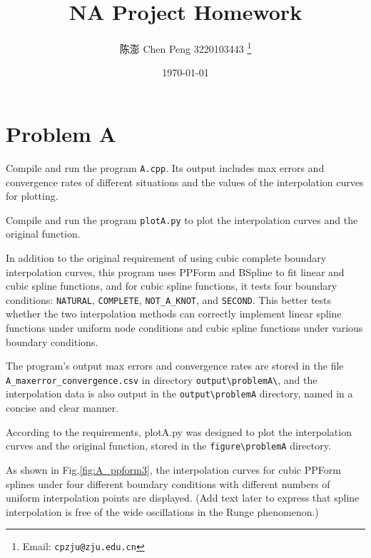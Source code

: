\documentclass[a4paper]{article}
\begin{document}
\begin{sloppypar}
\title{NA Project Homework}

\author{陈澎 Chen Peng 3220103443
  \thanks{Email: \texttt{cpzju@zju.edu.cn}}}

\date{\today}

\maketitle

\section*{Problem A}
Compile and run the program \verb|A.cpp|. Its output includes max errors and convergence rates of different situations and the values of the interpolation curves for plotting.

Compile and run the program \verb|plotA.py| to plot the interpolation curves
and the original function.

In addition to the original requirement of using cubic complete boundary
interpolation curves, this program uses PPForm and BSpline to fit linear and
cubic spline functions, and for cubic spline functions, it tests four boundary
conditions: \verb|NATURAL|, \verb|COMPLETE|, \verb|NOT_A_KNOT|, and
\verb|SECOND|. This better tests whether the two interpolation methods can
correctly implement linear spline functions under uniform node conditions and
cubic spline functions under various boundary conditions.

The program's output max errors and convergence rates are stored in the file
\verb|A_maxerror_convergence.csv| in directory \verb|output\problemA\|, and the
interpolation data is also output in the \verb|output\problemA| directory,
named in a concise and clear manner.

According to the requirements, plotA.py was designed to plot the interpolation
curves and the original function, stored in the \verb|figure\problemA|
directory.

As shown in Fig.\ref{fig:A_ppform3}, the interpolation curves for cubic PPForm
splines under four different boundary conditions with different numbers of
uniform interpolation points are displayed. (Add text later to express that
spline interpolation is free of the wide oscillations in the Runge phenomenon.)


\end{sloppypar}
\end{document}
